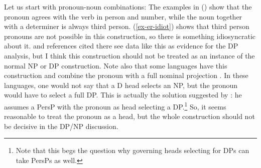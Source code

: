 \documentclass[output=paper
  ,nobabel
  ,draftmode
  ,uniformtopskip %
  ,colorlinks, citecolor=brown
]{langscibook}
\begin{document}
Let us start with pronoun-noun combinations: 
\eal
{}
\zl
The examples in () show that the pronoun agrees with the verb in person and number, while the
noun together with a determiner is always third person.
 (\ref{ex-er-idiot}) shows that third person pronouns are not possible in
this construction, so there is something idiosyncratic about it. \citet[--140]{Simon2003a-u} and
references cited there see data like this as evidence for the DP analysis, but I think this construction should
not be treated as an instance of the normal NP or DP construction. 
Note also that some languages have this construction and combine the pronoun with a full nominal
projection \citep[Section~5.3]{Hoehn2016a-u}. In these languages, one would not say that a D head
selects an NP, but the pronoun would have to select a full DP. This is actually the solution suggested by \citet[]{Hoehn2016a-u}: he assumes a PersP with the pronoun as head selecting a DP.\footnote{%
  Note that this begs the question why governing heads selecting for DPs can take PersPs as well.
} So, it seems
reasonable to treat the pronoun as a head, but the whole construction should not be decisive in the DP/NP discussion.

\end{document}
